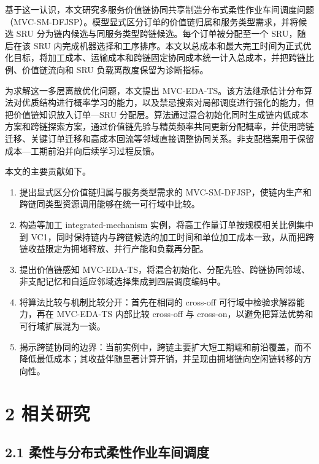 \documentclass[UTF8,11pt]{ctexart}
\begin{document}
基于这一认识，本文研究多服务价值链协同共享制造分布式柔性作业车间调度问题（MVC-SM-DFJSP）。模型显式区分订单的价值链归属和服务类型需求，并将候选 SRU 分为链内候选与同服务类型跨链候选。每个订单被分配至一个 SRU，随后在该 SRU 内完成机器选择和工序排序。本文以总成本和最大完工时间为正式优化目标，将加工成本、运输成本和跨链固定协同成本统一计入总成本，并把跨链比例、价值链流向和 SRU 负载离散度保留为诊断指标。

为求解这一多层离散优化问题，本文提出 MVC-EDA-TS。该方法继承估计分布算法对优质结构进行概率学习的能力，以及禁忌搜索对局部调度进行强化的能力，但把价值链知识放入订单—SRU 分配层。算法通过混合初始化同时生成链内低成本方案和跨链探索方案，通过价值链先验与精英频率共同更新分配概率，并使用跨链迁移、关键订单迁移和高成本回流等邻域直接调整协同关系。非支配档案用于保留成本—工期前沿并向后续学习过程反馈。

本文的主要贡献如下。

\begin{enumerate}
\item 提出显式区分价值链归属与服务类型需求的 MVC-SM-DFJSP，使链内生产和跨链同类型资源调用能够在统一可行域中比较。
\item 构造等加工 integrated-mechanism 实例，将高工作量订单按规模相关比例集中到 VC1，同时保持链内与跨链候选的加工时间和单位加工成本一致，从而把跨链收益限定为拥堵释放、并行产能和负载再分配。
\item 提出价值链感知 MVC-EDA-TS，将混合初始化、分配先验、跨链协同邻域、非支配记忆和自适应邻域选择集成到四层调度编码中。
\item 将算法比较与机制比较分开：首先在相同的 cross-off 可行域中检验求解器能力，再在 MVC-EDA-TS 内部比较 cross-off 与 cross-on，以避免把算法优势和可行域扩展混为一谈。
\item 揭示跨链协同的边界：当前实例中，跨链主要扩大短工期端和前沿覆盖，而不降低最低成本；其收益伴随显著计算开销，并呈现由拥堵链向空闲链转移的方向性。
\end{enumerate}

\section*{2 相关研究}

\subsection*{2.1 柔性与分布式柔性作业车间调度}
\end{document}
